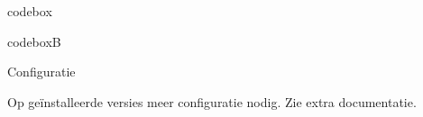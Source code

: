 \documentclass[presentatie.tex]{subfiles}
\begin{document}

\begin{saveblock}{codebox}
	\begin{highlightblock}
		\usepackage[backend=biber]{biblatex}
	\end{highlightblock}
\end{saveblock}

\begin{saveblock}{codeboxB}
	\begin{highlightblock}
	\end{highlightblock}
\end{saveblock}

\begin{frame}{Configuratie}

	\bigskip

	Op ge\"installeerde versies meer configuratie nodig. Zie extra documentatie.

\end{frame}

	



	
		
			
\end{document}
